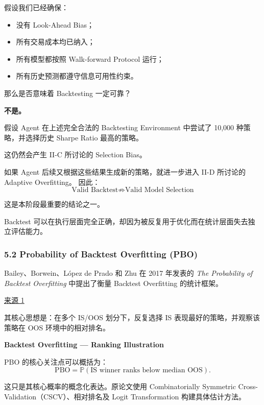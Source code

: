 假设我们已经确保：

\begin{itemize}
\tightlist
\item
  没有 Look-Ahead Bias；
\item
  所有交易成本均已纳入；
\item
  所有模型都按照 Walk-forward Protocol 运行；
\item
  所有历史预测都遵守信息可用性约束。
\end{itemize}

那么是否意味着 Backtesting 一定可靠？

\textbf{不是。}

假设 Agent 在上述完全合法的 Backtesting Environment 中尝试了 10,000 种策略，并选择历史 Sharpe Ratio 最高的策略。

这仍然会产生 II-C 所讨论的 Selection Bias。

如果 Agent 后续又根据这些结果生成新的策略，就进一步进入 II-D 所讨论的 Adaptive Overfitting。 因此：
\[\boxed{
\text{Valid Backtest}
\not\Rightarrow
\text{Valid Model Selection}
}\]

这是本阶段最重要的结论之一。

Backtest 可以在执行层面完全正确，却因为被反复用于优化而在统计层面失去独立评估能力。

\hypertarget{part-2-27-0001-probability-of-backtest-overfitting-pbo}{%
\subsubsection{5.2 Probability of Backtest Overfitting (PBO)}\label{part-2-27-0001-probability-of-backtest-overfitting-pbo}}

Bailey、Borwein、López de Prado 和 Zhu 在 2017 年发表的 \emph{The Probability of Backtest Overfitting} 中提出了衡量 Backtest Overfitting 的统计框架。

\href{https://scholarworks.wmich.edu/math_pubs/42/}{来源 1}

其核心思想是：在多个 IS/OOS 划分下，反复选择 IS 表现最好的策略，并观察该策略在 OOS 环境中的相对排名。

\textbf{Backtest Overfitting --- Ranking Illustration}


PBO 的核心关注点可以概括为：
\[\mathrm{PBO}
=
\mathbb P
\left(
\text{IS winner ranks below median OOS}
\right).\]

这只是其核心概率的概念化表达。原论文使用 Combinatorially Symmetric Cross-Validation（CSCV）、相对排名及 Logit Transformation 构建具体估计方法。

